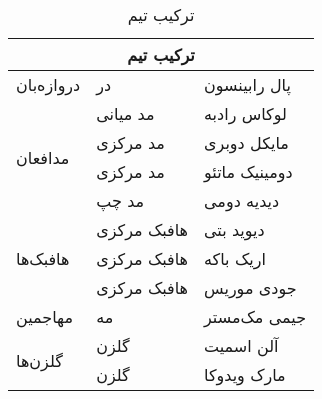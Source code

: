 \begin{table}[h]
	\centering
	\caption{ترکیب تیم}
	\begin{tabular}{|l|l|l|}
		\hline
		\multicolumn{3}{|c|}{ترکیب تیم} \\
		\hline
		دروازه‌بان & در & پال رابینسون \\
		\hline
		\multirow{4}{*}{مدافعان} & مد میانی & لوکاس رادبه \\
		& مد مرکزی & مایکل دوبری \\
		& مد مرکزی & دومینیک ماتئو \\
		& مد چپ & دیدیه دومی \\
		\hline
		\multirow{3}{*}{هافبک‌ها} & هافبک مرکزی & دیوید بتی \\
		& هافبک مرکزی & اریک باکه \\
		& هافبک مرکزی & جودی موریس \\
		\hline
		مهاجمین & مه & جیمی مک‌مستر \\
		\hline
		\multirow{2}{*}{گلزن‌ها} & گلزن & آلن اسمیت \\
		& گلزن & مارک ویدوکا \\
		\hline
	\end{tabular}
\end{table}

